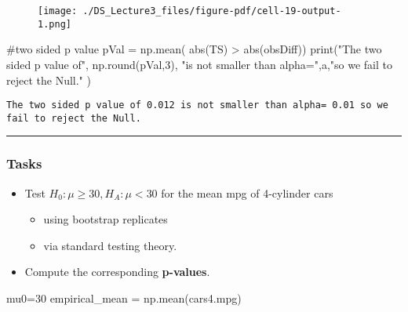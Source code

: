 \documentclass[
  letterpaper,
  DIV=11,
  numbers=noendperiod]{scrreprt}
\newenvironment{Shaded}{\begin{snugshade}}{\end{snugshade}}
\newcommand{\BuiltInTok}[1]{\textcolor[rgb]{0.00,0.23,0.31}{#1}}
\newcommand{\CommentTok}[1]{\textcolor[rgb]{0.37,0.37,0.37}{#1}}
\newcommand{\DecValTok}[1]{\textcolor[rgb]{0.68,0.00,0.00}{#1}}
\newcommand{\NormalTok}[1]{\textcolor[rgb]{0.00,0.23,0.31}{#1}}
\newcommand{\OperatorTok}[1]{\textcolor[rgb]{0.37,0.37,0.37}{#1}}
\newcommand{\StringTok}[1]{\textcolor[rgb]{0.13,0.47,0.30}{#1}}
\providecommand{\tightlist}{%
  \setlength{\itemsep}{0pt}\setlength{\parskip}{0pt}}\usepackage{longtable,booktabs,array}
\begin{document}
\begin{figure}[H]

{\centering \texttt{[image: ./DS\_Lecture3\_files/figure-pdf/cell-19-output-1.png]}

}

\end{figure}

\begin{Shaded}
\begin{Highlighting}[]
\CommentTok{\#two sided p value}
\NormalTok{pVal }\OperatorTok{=}\NormalTok{ np.mean( }\BuiltInTok{abs}\NormalTok{(TS) }\OperatorTok{\textgreater{}} \BuiltInTok{abs}\NormalTok{(obsDiff))}
\BuiltInTok{print}\NormalTok{(}\StringTok{"The two sided p value of"}\NormalTok{, np.}\BuiltInTok{round}\NormalTok{(pVal,}\DecValTok{3}\NormalTok{), }\StringTok{"is not smaller than alpha="}\NormalTok{,a,}\StringTok{"so we fail to reject the Null."}\NormalTok{ ) }
\end{Highlighting}
\end{Shaded}

\begin{verbatim}
The two sided p value of 0.012 is not smaller than alpha= 0.01 so we fail to reject the Null.
\end{verbatim}

\begin{center}\rule{0.5\linewidth}{0.5pt}\end{center}

\hypertarget{tasks-4}{%
\subsubsection{Tasks}\label{tasks-4}}

\begin{itemize}
\tightlist
\item
  Test \(H_0: \mu \geq 30, H_A: \mu < 30\) for the mean mpg of
  4-cylinder cars

  \begin{itemize}
  \tightlist
  \item
    using bootstrap replicates
  \item
    via standard testing theory.
  \end{itemize}
\item
  Compute the corresponding \textbf{p-values}.
\end{itemize}

\begin{Shaded}
\begin{Highlighting}[]
\NormalTok{mu0}\OperatorTok{=}\DecValTok{30}
\NormalTok{empirical\_mean }\OperatorTok{=}\NormalTok{ np.mean(cars4.mpg)}
\end{Highlighting}
\end{Shaded}
\end{document}

